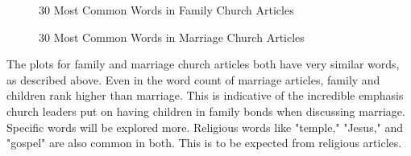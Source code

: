 \documentclass[twocolumn]{article}
\begin{document}


\begin{figure}[h]
    \centering
    \caption{30 Most Common Words in Family Church Articles}
    \label{fig:fcwc}
\end{figure}



\begin{figure}[h]
    \centering
    \caption{30 Most Common Words in Marriage Church Articles}
    \label{fig:mcwc}
\end{figure}

The plots for family and marriage church articles both have very similar words, as described above. Even in the word count of marriage articles, family and children rank higher than marriage. This is indicative of the incredible emphasis church leaders put on having children in family bonds when discussing marriage. Specific words will be explored more. Religious words like "temple," "Jesus," and "gospel" are also common in both. This is to be expected from religious articles.%
\end{document}
